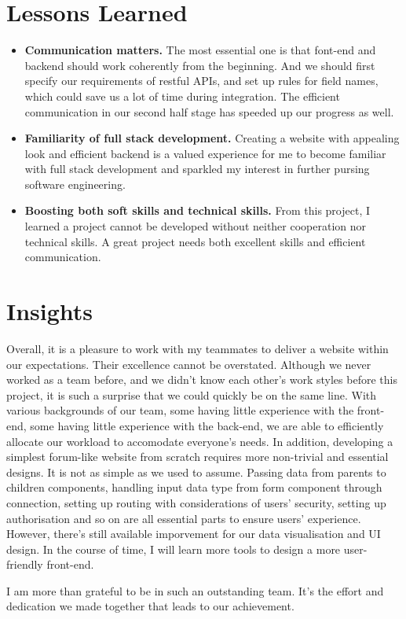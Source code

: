 \documentclass[12pt]{article}
\begin{document}
\section{Lessons Learned}
\begin{itemize}
    \item \textbf{Communication matters.} The most essential one is that font-end and backend should work coherently from the beginning. And we should first specify our requirements of restful APIs, and set up rules for field names, which could save us a lot of time during integration. The efficient communication in our second half stage has speeded up our progress as well.
    \item \textbf{Familiarity of full stack development.} Creating a website with appealing look and efficient backend is a valued experience for me to become familiar with full stack development and sparkled my interest in further pursing software engineering.
    \item \textbf{Boosting both soft skills and technical skills.} From this project, I learned a project cannot be developed without neither cooperation nor technical skills. A great project needs both excellent skills and efficient communication.
\end{itemize}

\section{Insights}
Overall, it is a pleasure to work with my teammates to deliver a website within our expectations. Their excellence cannot be overstated. Although we never worked as a team before, and we didn't know each other's work styles before this project, it is such a surprise that we could quickly be on the same line. With various backgrounds of our team, some having little experience with the front-end, some having little experience with the back-end, we are able to efficiently allocate our workload  to accomodate everyone's needs. In addition, developing a simplest forum-like website from scratch requires more non-trivial and essential designs. It is not as simple as we used to assume. Passing data from parents to children components, handling input data type from form component through connection, setting up routing with considerations of users' security, setting up authorisation and so on are all essential parts to ensure users' experience. However, there's still available imporvement for our data visualisation and UI design. In the course of time, I will learn more tools to design a more user-friendly front-end.

I am more than grateful to be in such an outstanding team. It's the effort and dedication we made together that leads to our achievement.
\end{document}
